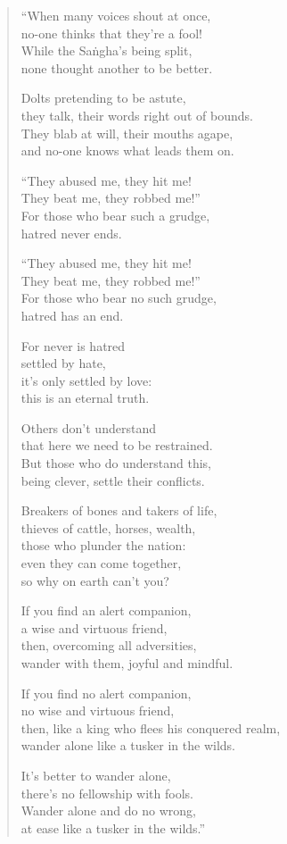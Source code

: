\documentclass[12pt,openany]{book}%
\begin{document}
\begin{verse}%
“When many voices shout at once, \\
no-one thinks that they’re a fool! \\
While the \textsanskrit{Saṅgha}’s being split, \\
none thought another to be better. 

Dolts pretending to be astute, \\
they talk, their words right out of bounds. \\
They blab at will, their mouths agape, \\
and no-one knows what leads them on. 

“They abused me, they hit me! \\
They beat me, they robbed me!” \\
For those who bear such a grudge, \\
hatred never ends. 

“They abused me, they hit me! \\
They beat me, they robbed me!” \\
For those who bear no such grudge, \\
hatred has an end. 

For never is hatred \\
settled by hate, \\
it’s only settled by love: \\
this is an eternal truth. 

Others don’t understand \\
that here we need to be restrained. \\
But those who do understand this, \\
being clever, settle their conflicts. 

Breakers of bones and takers of life, \\
thieves of cattle, horses, wealth, \\
those who plunder the nation: \\
even they can come together, \\
so why on earth can’t you? 

If you find an alert companion, \\
a wise and virtuous friend, \\
then, overcoming all adversities, \\
wander with them, joyful and mindful. 

If you find no alert companion, \\
no wise and virtuous friend, \\
then, like a king who flees his conquered realm, \\
wander alone like a tusker in the wilds. 

It’s better to wander alone, \\
there’s no fellowship with fools. \\
Wander alone and do no wrong, \\
at ease like a tusker in the wilds.” 

%
\end{verse}
\end{document}

